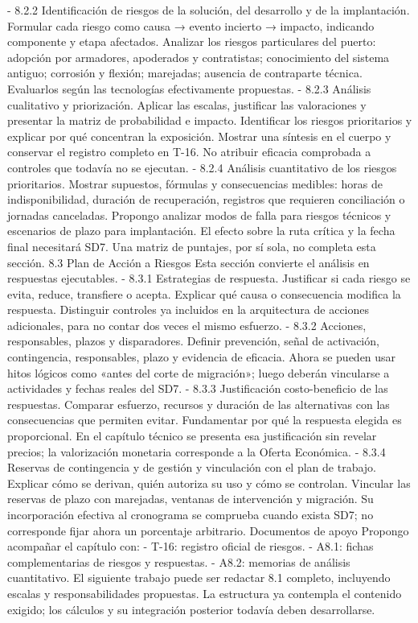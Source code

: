 - 8.2.2 Identificación de riesgos de la solución, del desarrollo y de la implantación. Formular cada riesgo como causa → evento incierto → impacto, indicando componente y etapa afectados. Analizar los riesgos particulares del puerto: adopción por armadores, apoderados y contratistas; conocimiento del sistema antiguo; corrosión y flexión; marejadas; ausencia de contraparte técnica. Evaluarlos según las tecnologías efectivamente propuestas.
- 8.2.3 Análisis cualitativo y priorización. Aplicar las escalas, justificar las valoraciones y presentar la matriz de probabilidad e impacto. Identificar los riesgos prioritarios y explicar por qué concentran la exposición. Mostrar una síntesis en el cuerpo y conservar el registro completo en T-16. No atribuir eficacia comprobada a controles que todavía no se ejecutan.
- 8.2.4 Análisis cuantitativo de los riesgos prioritarios. Mostrar supuestos, fórmulas y consecuencias medibles: horas de indisponibilidad, duración de recuperación, registros que requieren conciliación o jornadas canceladas. Propongo analizar modos de falla para riesgos técnicos y escenarios de plazo para implantación. El efecto sobre la ruta crítica y la fecha final necesitará SD7. Una matriz de puntajes, por sí sola, no completa esta sección.
8.3 Plan de Acción a Riesgos
Esta sección convierte el análisis en respuestas ejecutables.
- 8.3.1 Estrategias de respuesta. Justificar si cada riesgo se evita, reduce, transfiere o acepta. Explicar qué causa o consecuencia modifica la respuesta. Distinguir controles ya incluidos en la arquitectura de acciones adicionales, para no contar dos veces el mismo esfuerzo.
- 8.3.2 Acciones, responsables, plazos y disparadores. Definir prevención, señal de activación, contingencia, responsables, plazo y evidencia de eficacia. Ahora se pueden usar hitos lógicos como «antes del corte de migración»; luego deberán vincularse a actividades y fechas reales del SD7.
- 8.3.3 Justificación costo-beneficio de las respuestas. Comparar esfuerzo, recursos y duración de las alternativas con las consecuencias que permiten evitar. Fundamentar por qué la respuesta elegida es proporcional. En el capítulo técnico se presenta esa justificación sin revelar precios; la valorización monetaria corresponde a la Oferta Económica.
- 8.3.4 Reservas de contingencia y de gestión y vinculación con el plan de trabajo. Explicar cómo se derivan, quién autoriza su uso y cómo se controlan. Vincular las reservas de plazo con marejadas, ventanas de intervención y migración. Su incorporación efectiva al cronograma se comprueba cuando exista SD7; no corresponde fijar ahora un porcentaje arbitrario.
Documentos de apoyo
Propongo acompañar el capítulo con:
- T-16: registro oficial de riesgos.
- A8.1: fichas complementarias de riesgos y respuestas.
- A8.2: memorias de análisis cuantitativo.
El siguiente trabajo puede ser redactar 8.1 completo, incluyendo escalas y responsabilidades propuestas. La estructura ya contempla el contenido exigido; los cálculos y su integración posterior todavía deben desarrollarse.